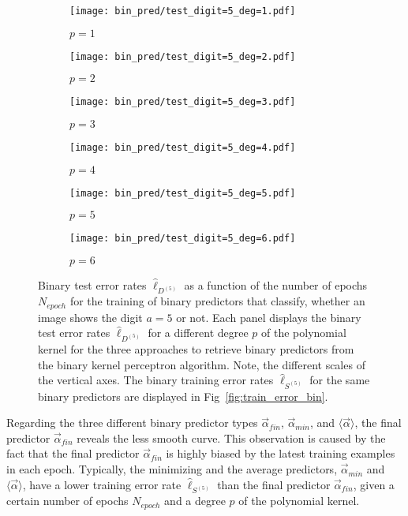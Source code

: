 \begin{figure}[h!]
    \begin{subfigure}[t]{0.49\textwidth}
        \centering
        \texttt{[image: bin\_pred/test\_digit=5\_deg=1.pdf]} 
        \caption{$p = 1$}
    \end{subfigure}
    \hfill
    \begin{subfigure}[t]{0.49\textwidth}
        \centering
        \texttt{[image: bin\_pred/test\_digit=5\_deg=2.pdf]} 
        \caption{$p = 2$}
    \end{subfigure}
    \par\bigskip
        \begin{subfigure}[t]{0.49\textwidth}
        \centering
        \texttt{[image: bin\_pred/test\_digit=5\_deg=3.pdf]} 
        \caption{$p = 3$}
    \end{subfigure}
    \hfill
    \begin{subfigure}[t]{0.49\textwidth}
        \centering
        \texttt{[image: bin\_pred/test\_digit=5\_deg=4.pdf]} 
        \caption{$p = 4$}
    \end{subfigure}
    \par\bigskip
        \begin{subfigure}[t]{0.49\textwidth}
        \centering
        \texttt{[image: bin\_pred/test\_digit=5\_deg=5.pdf]} 
        \caption{$p = 5$}
    \end{subfigure}
    \hfill
    \begin{subfigure}[t]{0.49\textwidth}
        \centering
        \texttt{[image: bin\_pred/test\_digit=5\_deg=6.pdf]} 
        \caption{$p = 6$}
    \end{subfigure}
    \caption{Binary test error rates $\hat{\ell}_{D^{(5)}}$ as a function of the number of epochs $N_{epoch}$ for the training of binary predictors that classify, whether an image shows the digit $a=5$ or not. Each panel displays the binary test error rates $\hat{\ell}_{D^{(5)}}$ for a different degree $p$ of the polynomial kernel for the three approaches to retrieve binary predictors from the binary kernel perceptron algorithm. Note, the different scales of the vertical axes. The binary training error rates $\hat{\ell}_{S^{(5)}}$ for the same binary predictors are displayed in Fig~\ref{fig:train_error_bin}.} \label{fig:test_error_bin}
\end{figure}

Regarding the three different binary predictor types $\vec{\alpha}_{fin}$, $\vec{\alpha}_{min}$, and $\langle\vec{\alpha}\rangle$, the final predictor $\vec{\alpha}_{fin}$ reveals the less smooth curve. This observation is caused by the fact that the final predictor $\vec{\alpha}_{fin}$ is highly biased by the latest training examples in each epoch. Typically, the minimizing and the average predictors, $\vec{\alpha}_{min}$ and $\langle\vec{\alpha}\rangle$, have a lower training error rate $\hat{\ell}_{S^{(5)}}$ than the final predictor $\vec{\alpha}_{fin}$, given a certain number of epochs $N_{epoch}$ and a degree $p$ of the polynomial kernel. \\

